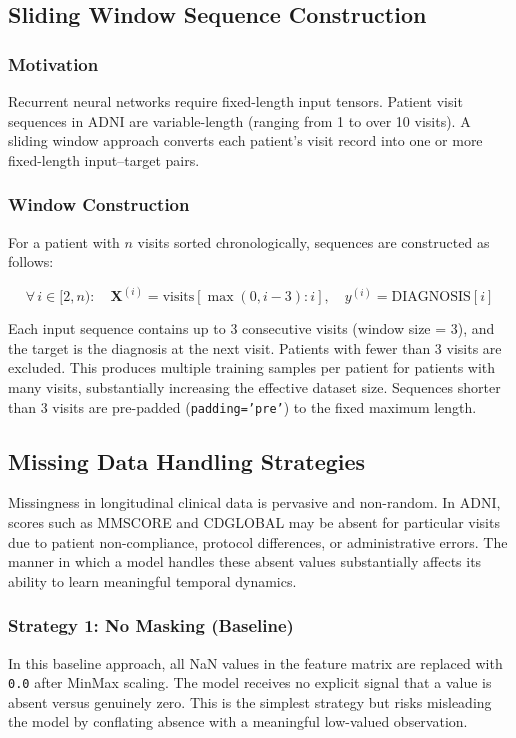 \documentclass[12pt,singleside,a4paper]{article}
\begin{document}
\subsection{Sliding Window Sequence Construction}

\subsubsection{Motivation}
Recurrent neural networks require fixed-length input tensors. Patient visit sequences in ADNI are variable-length (ranging from 1 to over 10 visits). A sliding window approach converts each patient's visit record into one or more fixed-length input--target pairs.

\subsubsection{Window Construction}
For a patient with $n$ visits sorted chronologically, sequences are constructed as follows:

\begin{equation}
    \forall\, i \in [2, n): \quad \mathbf{X}^{(i)} = \text{visits}[\max(0, i-3):i],\quad y^{(i)} = \text{DIAGNOSIS}[i]
\end{equation}

Each input sequence contains up to 3 consecutive visits (window size = 3), and the target is the diagnosis at the next visit. Patients with fewer than 3 visits are excluded. This produces multiple training samples per patient for patients with many visits, substantially increasing the effective dataset size. Sequences shorter than 3 visits are pre-padded (\texttt{padding='pre'}) to the fixed maximum length.



\subsection{Missing Data Handling Strategies}

Missingness in longitudinal clinical data is pervasive and non-random. In ADNI, scores such as MMSCORE and CDGLOBAL may be absent for particular visits due to patient non-compliance, protocol differences, or administrative errors. The manner in which a model handles these absent values substantially affects its ability to learn meaningful temporal dynamics.

\subsubsection{Strategy 1: No Masking (Baseline)}
In this baseline approach, all NaN values in the feature matrix are replaced with \texttt{0.0} after MinMax scaling. The model receives no explicit signal that a value is absent versus genuinely zero. This is the simplest strategy but risks misleading the model by conflating absence with a meaningful low-valued observation.
\end{document}
